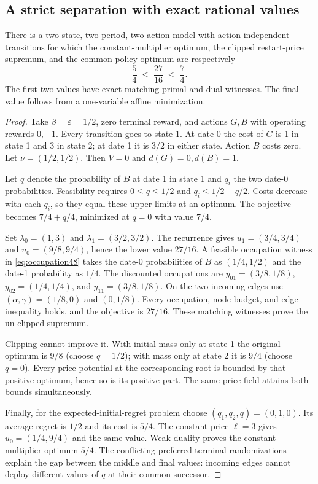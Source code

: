 \subsection{A strict separation with exact rational values}
\begin{theorem}\label{thm:separation}
There is a two-state, two-period, two-action model with action-independent transitions for which the constant-multiplier optimum, the clipped restart-price supremum, and the common-policy optimum are respectively
\begin{equation}\label{eq:strict48}
 \frac54\;<\;\frac{27}{16}\;<\;\frac74.
\end{equation}
The first two values have exact matching primal and dual witnesses. The final value follows from a one-variable affine minimization.
\end{theorem}
\begin{proof}
Take $\beta=\varepsilon=1/2$, zero terminal reward, and actions $G,B$ with operating rewards $0,-1$. Every transition goes to state 1. At date 0 the cost of $G$ is 1 in state 1 and 3 in state 2; at date 1 it is $3/2$ in either state. Action $B$ costs zero. Let $\nu=(1/2,1/2)$. Then $V=0$ and $d(G)=0,d(B)=1$.

Let $q$ denote the probability of $B$ at date 1 in state 1 and $q_i$ the two date-0 probabilities. Feasibility requires $0\le q\le1/2$ and $q_i\le1/2-q/2$. Costs decrease with each $q_i$, so they equal these upper limits at an optimum. The objective becomes $7/4+q/4$, minimized at $q=0$ with value $7/4$.

Set $\lambda_0=(1,3)$ and $\lambda_1=(3/2,3/2)$. The recurrence gives $u_1=(3/4,3/4)$ and $u_0=(9/8,9/4)$, hence the lower value $27/16$. A feasible occupation witness in \eqref{eq:occupation48} takes the date-0 probabilities of $B$ as $(1/4,1/2)$ and the date-1 probability as $1/4$. The discounted occupations are $y_{01}=(3/8,1/8)$, $y_{02}=(1/4,1/4)$, and $y_{11}=(3/8,1/8)$. On the two incoming edges use $(\alpha,\gamma)=(1/8,0)$ and $(0,1/8)$. Every occupation, node-budget, and edge inequality holds, and the objective is $27/16$. These matching witnesses prove the un-clipped supremum.

Clipping cannot improve it. With initial mass only at state 1 the original optimum is $9/8$ (choose $q=1/2$); with mass only at state 2 it is $9/4$ (choose $q=0$). Every price potential at the corresponding root is bounded by that positive optimum, hence so is its positive part. The same price field attains both bounds simultaneously.

Finally, for the expected-initial-regret problem choose $(q_1,q_2,q)=(0,1,0)$. Its average regret is $1/2$ and its cost is $5/4$. The constant price $\ell=3$ gives $u_0=(1/4,9/4)$ and the same value. Weak duality proves the constant-multiplier optimum $5/4$. The conflicting preferred terminal randomizations explain the gap between the middle and final values: incoming edges cannot deploy different values of $q$ at their common successor.
\end{proof}

